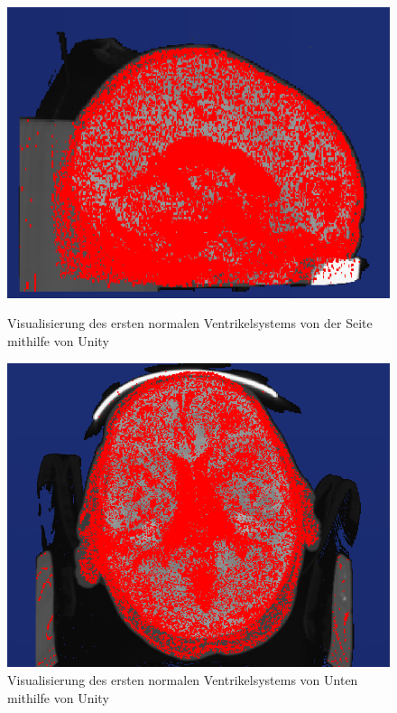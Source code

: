 \begin{figure}[h]
\begin{minipage}[b]{.5\textwidth}
  \centering
  \includegraphics[width=.98\linewidth, height=.98\linewidth]{Logos/Normal1_Unity/Seite.PNG}
  \caption{Visualisierung des ersten normalen Ventrikelsystems von der Seite mithilfe von Unity}
  \label{fig:unity_s}
\end{minipage}%
\begin{minipage}[b]{.5\textwidth}
  \centering
  \includegraphics[width=.98\linewidth, height=.98\linewidth]{Logos/Normal1_Unity/Unten3.PNG}
  \caption{Visualisierung des ersten normalen Ventrikelsystems von Unten mithilfe von Unity}
  \label{fig:unity_u}
\end{minipage}
\end{figure}


